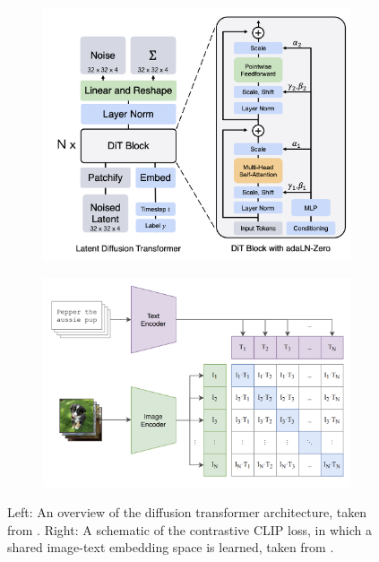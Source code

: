 \begin{figure}[!t]
\centering
\begin{subfigure}{.5\textwidth}
  \centering
  \includegraphics[width=0.95\linewidth]{figures/dit.png}
  \label{fig:sub1}
\end{subfigure}%
\begin{subfigure}{.5\textwidth}
  \centering
  \includegraphics[width=0.95\linewidth]{figures/clip.png}
  \label{fig:sub2}
\end{subfigure}
\caption{Left: An overview of the diffusion transformer architecture, taken from \cite{dit}. Right: A schematic of the contrastive CLIP loss, in which a shared image-text embedding space is learned, taken from \cite{clip}.}
\label{fig:test}
\end{figure}

